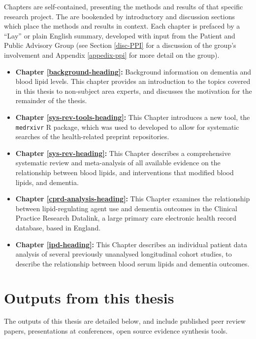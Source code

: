 \documentclass[a4paper, twoside]{templates/ociamthesis}
\providecommand{\tightlist}{%
  \setlength{\itemsep}{0pt}\setlength{\parskip}{0pt}}
\begin{document}
Chapters are self-contained, presenting the methods and results of that specific research project. The are bookended by introductory and discussion sections which place the methods and results in context. Each chapter is prefaced by a ``Lay'' or plain English summary, developed with input from the Patient and Public Advisory Group (see Section \ref{disc-PPI} for a discussion of the group's involvement and Appendix \ref{appedix-ppi} for more detail on the group).

\begin{itemize}
\tightlist
\item
  \textbf{Chapter \ref{background-heading}:} Background information on dementia and blood lipid levels. This chapter provides an introduction to the topics covered in this thesis to non-subject area experts, and discusses the motivation for the remainder of the thesis.
\item
  \textbf{Chapter \ref{sys-rev-tools-heading}:} This Chapter introduces a new tool, the \texttt{medrxivr} R package, which was used to developed to allow for systematic searches of the health-related preprint repositories.
\item
  \textbf{Chapter \ref{sys-rev-heading}:} This Chapter describes a comprehensive systematic review and meta-analysis of all available evidence on the relationship between blood lipids, and interventions that modified blood lipids, and dementia.
\item
  \textbf{Chapter \ref{cprd-analysis-heading}:} This Chapter examines the relationship between lipid-regulating agent use and dementia outcomes in the Clinical Practice Research Datalink, a large primary care electronic health record database, based in England.
\item
  \textbf{Chapter \ref{ipd-heading}:} This Chapter describes an individual patient data analysis of several previously unanalysed longitudinal cohort studies, to describe the relationship between blood serum lipids and dementia outcomes.
\end{itemize}

\hypertarget{thesis-output}{%
\section{Outputs from this thesis}\label{thesis-output}}

The outputs of this thesis are detailed below, and include published peer review papers, presentations at conferences, open source evidence synthesis tools.
\end{document}
